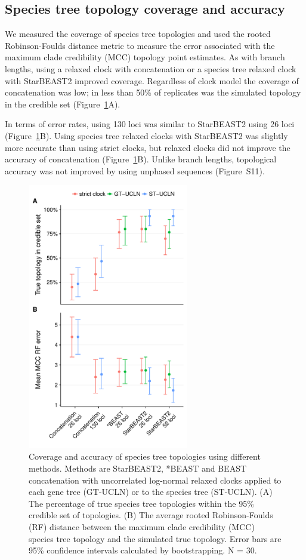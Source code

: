 \documentclass[nogrid]{MBE}%
\begin{document}
\subsection{Species tree topology coverage and accuracy}

We measured the coverage of
species tree topologies and used the rooted Robinson-Foulds distance metric to measure the error associated with the maximum clade credibility (MCC)
topology point estimates. As with branch lengths, using a relaxed clock with
concatenation or a species tree relaxed clock with StarBEAST2 improved
coverage. Regardless of clock model the coverage of concatenation was low; in
less than 50\% of replicates was the simulated topology in the credible set
(Figure~\ref{fig:treeTopologyError}A).

In terms of error rates, using 130 loci was similar to StarBEAST2 using 26 loci
(Figure~\ref{fig:treeTopologyError}B). Using species tree relaxed clocks with
StarBEAST2 was slightly more accurate than using strict clocks, but relaxed
clocks did not improve the accuracy of concatenation
(Figure~\ref{fig:treeTopologyError}B). Unlike branch lengths, topological
accuracy was not improved by using unphased sequences (Figure~S11).

\begin{figure}[htb!]
\centering
\includegraphics[width=70mm]{topology_accuracy_phased.pdf}
\caption
{Coverage and accuracy of species tree topologies using different methods.
Methods are StarBEAST2, *BEAST and BEAST concatenation with uncorrelated
log-normal relaxed clocks applied to each gene tree (GT-UCLN) or to the species
tree (ST-UCLN). (A) The percentage of true species tree topologies within the
95\% credible set of topologies. (B) The average rooted Robinson-Foulds (RF)
distance between the maximum clade credibility (MCC) species tree topology and
the simulated true topology. Error bars are 95\% confidence intervals
calculated by bootstrapping. N = 30.}
\label{fig:treeTopologyError}
\end{figure}
\end{document}
